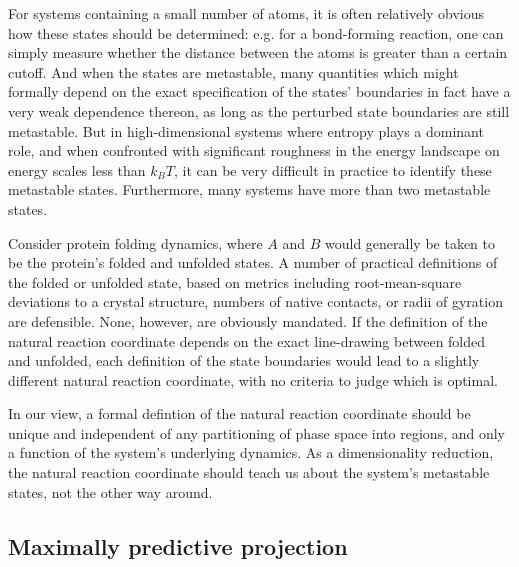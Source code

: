 \documentclass[aip, jcp, reprint, nolinenumbers, twocolumn, nobalancelastpage, nofootinbib]{revtex4-1}
\begin{document}

For systems containing a small number of atoms, it is often relatively obvious how these states should be determined: e.g. for a bond-forming reaction, one can simply measure whether the distance between the atoms is greater than a certain cutoff. And when the states are metastable, many quantities which might formally depend on the exact specification of the states' boundaries in fact have a very weak dependence thereon, as long as the perturbed state boundaries are still metastable.\cite{hummer2004from} But in high-dimensional systems where entropy plays a dominant role, and when confronted with significant roughness in the energy landscape on energy scales less than $k_BT$, it can be very difficult in practice to identify these metastable states. Furthermore, many systems have more than two metastable states.

Consider protein folding dynamics, where $A$ and $B$ would generally be taken to be the protein's folded and unfolded states. A number of practical definitions of the folded or unfolded state, based on metrics including root-mean-square deviations to a crystal structure, numbers of native contacts, or radii of gyration are defensible. None, however, are obviously mandated. If the definition of the natural reaction coordinate depends on the exact line-drawing between folded and unfolded, each definition of the state boundaries would lead to a slightly different natural reaction coordinate, with no criteria to judge which is optimal.

In our view, a formal defintion of the natural reaction coordinate should be unique and independent of any partitioning of phase space into regions, and only a function of the system's underlying dynamics. As a dimensionality reduction, the natural reaction coordinate should teach us about the system's metastable states, not the other way around.

\subsection{Maximally predictive projection}
\label{subsect:Maximally_predictive}
\end{document}
